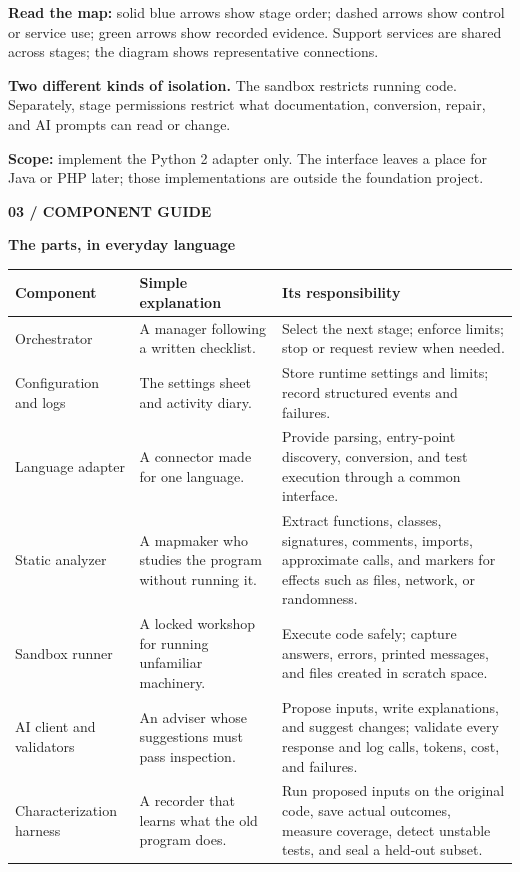 \documentclass[11pt,a4paper]{article}
\newcommand{\pageheading}[2]{%
  {\small\color{blue}\sffamily\bfseries #1}\par
  {\LARGE\color{ink}\sffamily\bfseries #2}\par\vspace{3mm}}
\newcommand{\callout}[2]{%
  \par\noindent\colorbox{#1}{%
    \parbox{\dimexpr\linewidth-2\fboxsep\relax}{\strut #2\strut}}\par}
\begin{document}
\textbf{Read the map:} solid blue arrows show stage order; dashed arrows show
control or service use; green arrows show recorded evidence. Support services
are shared across stages; the diagram shows representative connections.

\callout{greenwash}{\textbf{Two different kinds of isolation.}
The sandbox restricts running code. Separately, stage permissions restrict what
documentation, conversion, repair, and AI prompts can read or change.}

\textbf{Scope:} implement the Python 2 adapter only. The interface leaves a place
for Java or PHP later; those implementations are outside the foundation project.

\newpage
\pageheading{03 / COMPONENT GUIDE}{The parts, in everyday language}

\small
\begin{tabularx}{\linewidth}{@{}p{3.2cm}YY@{}}
\toprule
\textbf{Component} & \textbf{Simple explanation} & \textbf{Its responsibility}\\
\midrule
Orchestrator & A manager following a written checklist.
  & Select the next stage; enforce limits; stop or request review when needed.\\
Configuration and logs & The settings sheet and activity diary.
  & Store runtime settings and limits; record structured events and failures.\\
Language adapter & A connector made for one language.
  & Provide parsing, entry-point discovery, conversion, and test execution
    through a common interface.\\
Static analyzer & A mapmaker who studies the program without running it.
  & Extract functions, classes, signatures, comments, imports, approximate
    calls, and markers for effects such as files, network, or randomness.\\
Sandbox runner & A locked workshop for running unfamiliar machinery.
  & Execute code safely; capture answers, errors, printed messages,
    and files created in scratch space.\\
AI client and validators & An adviser whose suggestions must pass inspection.
  & Propose inputs, write explanations, and suggest changes; validate every
    response and log calls, tokens, cost, and failures.\\
Characterization harness & A recorder that learns what the old program does.
  & Run proposed inputs on the original code, save actual outcomes, measure
    coverage, detect unstable tests, and seal a held-out subset.\\

\end{tabularx}
\end{document}
